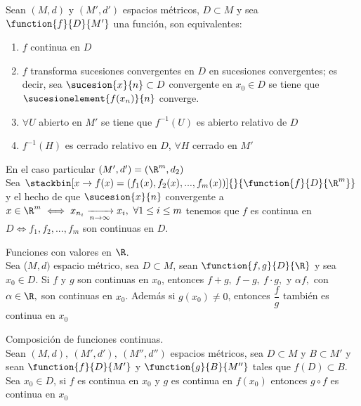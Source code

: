 	\begin{proposicion} Sean $(M,d)$ y $(M',d')$ espacios métricos, $D\subset M$ y sea $\function{f}{D}{M'}$ una función, son equivalentes:
	\begin{enumerate}[1)]
	\item $f$ continua en $D$
	\item $f$ transforma sucesiones convergentes en $D$ en sucesiones convergentes; es decir, sea $\sucesion{x}{n}\subset D$ convergente en $x_0\in D$ se tiene que $\sucesionelement{f(x_n)}{n}$ converge.
	\item $\forall U$ abierto en $M'$ se tiene que $f^{-1}(U)$ es abierto relativo de $D$
	\item $f^{-1}(H)$ es cerrado relativo en $D$, $\forall H$ cerrado en $M'$
	\end{enumerate}
	\begin{observacion} En el caso particular $(M',d')=(\R^m,d_2)$\\
		Sea $\stackbin[x\rightarrow f(x)=\left(f_1(x),f_2(x),...,f_m(x)\right)]{}{\function{f}{D}{\R^m}}$ y el hecho de que $\sucesion{x}{n}$ convergente a $x\in\R^m\iff x_{n_i}\xrightarrow[n\rightarrow\infty]{}x_i,\ \forall 1\leq i\leq m$ tenemos que $f$ es continua en $D\iff f_1,f_2,...,f_m$ son continuas en $D$.
	\end{observacion}
	\end{proposicion}
	
	\begin{proposicion} Funciones con valores en $\R$.\\	
	Sea ($M,d)$ espacio métrico, sea $D\subset M$, sean $\function{f,g}{D}{\R}$ y sea $x_0\in D$. Si $f$ y $g$ son continuas en $x_0$, entonces $f+g,\ f-g,\ f\cdot g,$ y $\alpha f,$ con $ \alpha\in\R,$ son continuas en $x_0$. Además si $g(x_0)\neq 0$, entonces $\dfrac{f}{g}$ también es continua en $x_0$
	\end{proposicion}
	
	\begin{proposicion} Composición de funciones continuas.\\
	Sean $(M,d),\ (M',d'),\ (M'',d'')$ espacios métricos, sea $D\subset M$ y $B\subset M'$ y sean $\function{f}{D}{M'}$ y $\function{g}{B}{M''}$ tales que $f(D)\subset B$.\\
	Sea $x_0\in D$, si $f$ es continua en $x_0$ y $g$ es continua en $f(x_0)$ entonces $g\circ f$ es continua en $x_0$
	\end{proposicion}
	
